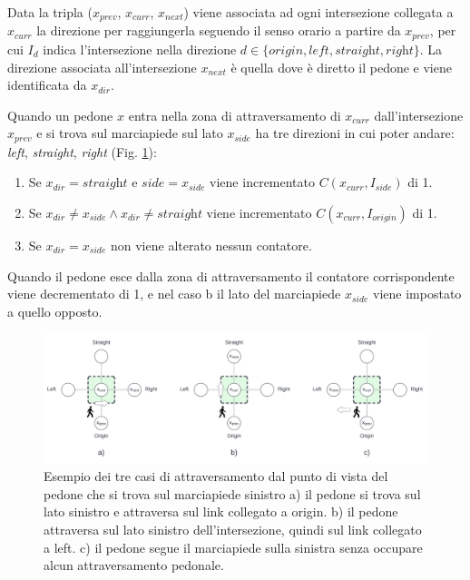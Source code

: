 Data la tripla ($x_{prev}$, $x_{curr}$, $x_{next}$) viene associata ad ogni intersezione collegata a $x_{curr}$ la direzione per raggiungerla seguendo il senso orario a partire da $x_{prev}$,
per cui $I_d$ indica l'intersezione nella direzione $d \in \{\textit{origin}, \textit{left}, \textit{straight}, \textit{right}\}$.
%
La direzione associata all'intersezione $x_{next}$ è quella dove è diretto il pedone e viene identificata da $x_{dir}$.

\pagebreak

Quando un pedone $x$ entra nella zona di attraversamento di $x_{curr}$ dall'intersezione $x_{prev}$ e si trova sul marciapiede sul lato $x_{side}$
ha tre direzioni in cui poter andare: \textit{left}, \textit{straight}, \textit{right} (Fig. \ref{fig:pedestria-crossing}):
\begin{enumerate}[label=\alph*)]
    \item Se $x_{dir} = \textit{straight}$ e $\textit{side} = x_{side}$ viene incrementato $C(x_{curr}, I_{\textit{side}})$ di 1.
    \item Se $x_{dir} \neq x_{side} \land x_{dir} \neq \textit{straight}$ viene incrementato $C(x_{curr}, I_{\textit{origin}})$ di 1.
    \item Se  $x_{dir} = x_{side}$ non viene alterato nessun contatore.
\end{enumerate}

Quando il pedone esce dalla zona di attraversamento il contatore corrispondente viene decrementato di 1, e nel caso b
il lato del marciapiede $x_{side}$ viene impostato a quello opposto.

\begin{figure}[ht]
    \centering
    \includegraphics[width=\textwidth]{images/pedestrian_crossing}
    \caption{
        Esempio dei tre casi di attraversamento dal punto di vista del pedone che si trova sul marciapiede sinistro
        a) il pedone si trova sul lato sinistro e attraversa sul link collegato a origin.
        b) il pedone attraversa sul lato sinistro dell'intersezione, quindi sul link collegato a left.
        c) il pedone segue il marciapiede sulla sinistra senza occupare alcun attraversamento pedonale.
    }
    \label{fig:pedestria-crossing}
\end{figure}


